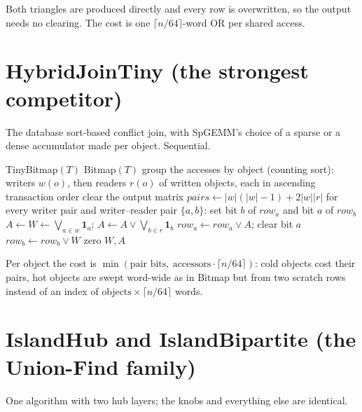 \documentclass[10pt,a4paper]{article}
\newcommand{\words}{\lceil n/64 \rceil}
\newcommand{\bit}[1]{\mathbf{1}_{#1}}
\begin{document}
Both triangles are produced directly and every row is overwritten, so the output needs no
clearing. The cost is one $\words$-word OR per shared access.

\section{HybridJoinTiny (the strongest competitor)}

The database sort-based conflict join, with SpGEMM's choice of a sparse or a dense accumulator
made per object. Sequential.

\begin{algorithm}[H]
\caption{HybridJoinTiny$(T)$}
\begin{algorithmic}[1]
 \Return TinyBitmap$(T)$ \EndIf
\If{$\words < 4$} \Return Bitmap$(T)$  \EndIf
\State group the accesses by object (counting sort): writers $w(o)$, then readers $r(o)$ of written
       objects, each in ascending transaction order
\State clear the output matrix
  \State $pairs \gets |w|(|w|-1) + 2|w||r|$
  \If{$pairs \le (|w|+|r|)\cdot\words$} 
    \State for every writer pair and writer--reader pair $\{a,b\}$: set bit $b$ of $row_a$ and bit $a$ of $row_b$
  \Else {}
    \State $A \gets W \gets \bigvee_{a\in w}\bit{a}$; \quad $A \gets A \lor \bigvee_{b\in r}\bit{b}$ 
     $row_a \gets row_a \lor A$; clear bit $a$ \EndFor
     $row_b \gets row_b \lor W$ \EndFor
    \State zero $W, A$
  \EndIf
\EndFor
\end{algorithmic}
\end{algorithm}

Per object the cost is $\min(\text{pair bits},\ \text{accessors}\cdot\words)$: cold objects cost
their pairs, hot objects are swept word-wide as in Bitmap but from two scratch rows instead of an
index of $\text{objects}\times\words$ words.

\section{IslandHub and IslandBipartite (the Union-Find family)}

One algorithm with two hub layers; the knobs and everything else are identical.
\end{document}
